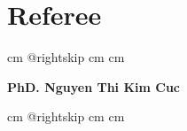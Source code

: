 \documentclass[10pt, letterpaper]{article}
\begin{document}
    \section{Referee}

        \begingroup{} cm
        \advance\csname @rightskip cm
        \advance{} cm

        \textbf{PhD. Nguyen Thi Kim Cuc} \par\endgroup

        \vspace{0.2 cm}
        \begingroup{} cm
        \advance\csname @rightskip cm
        \advance{} cm
    
\end{document}
